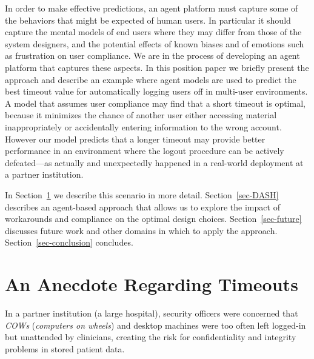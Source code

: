 \documentclass{acm_proc_article-sp}
\newcommand{\secref}[1] {Section~\ref{sec-#1}}
\newcommand{\ignore}[1] {}
\begin{document}
In order to make effective predictions, an agent platform must capture
some of the behaviors that might be expected of human users. In
particular it should capture the mental models of end users where they
may differ from those of the system designers, and the potential
effects of known biases and of emotions such as frustration on user
compliance.  We are in the process of developing an agent platform
that captures these aspects. In this position paper we briefly present
the approach and describe an example where agent models are used to
predict the best timeout value for automatically logging users off in
multi-user environments.  A model that assumes user compliance may
find that a short timeout is optimal, because it minimizes the chance
of another user either accessing material inappropriately or
accidentally entering information to the wrong account. However our
model predicts that a longer timeout may provide better performance in
an environment where the logout procedure can be actively
defeated---as actually and unexpectedly happened in a real-world
deployment at a partner institution.

In \secref{timeouts} we describe this scenario in more
detail. \secref{DASH} describes an agent-based approach that allows us
to explore the impact of workarounds and compliance on the optimal
design choices. \secref{future} discusses future work and other
domains in which to apply the approach. \secref{conclusion} concludes.

\section{An Anecdote Regarding Timeouts}
\label{sec-timeouts}


In a partner institution (a large hospital), security officers were concerned
that {\em COWs} ({\em computers on wheels}) and desktop machines were 
too often left logged-in but unattended by clinicians, creating
the risk for confidentiality and integrity problems in stored patient data.

\ignore{In a partner institution (a large hospital),
clinicians used {\em COWs} ({\em computers on wheels}) and desktop machines.
The security officers were concerned
that these systems were too often left logged-in but unattended, creating
the risk for confidentiality and integrity problems in stored patient data.}
\end{document}
